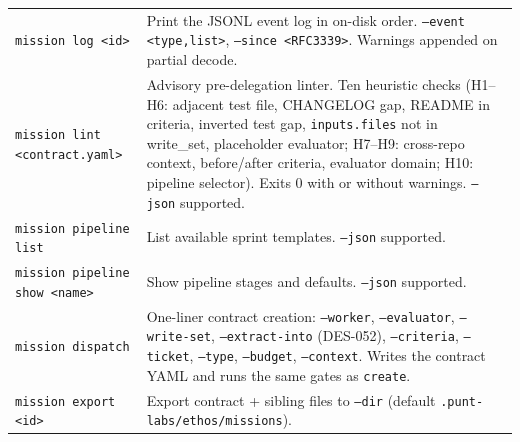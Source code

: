 \documentclass[a4paper,10pt]{article}
\newcommand{\field}[1]{\texttt{#1}}
\newcommand{\cmd}[1]{\texttt{#1}}
\newcommand{\fpath}[1]{\texttt{#1}}
\begin{document}
\begin{center}
\begin{tabular}{@{}lp{6.5cm}@{}}
\cmd{mission log <id>}              & Print the JSONL event log
                                       in on-disk order.
                                       \cmd{--event <type,list>},
                                       \cmd{--since <RFC3339>}.
                                       Warnings appended on
                                       partial decode. \\
\cmd{mission lint <contract.yaml>}  & Advisory pre-delegation
                                       linter.  Ten heuristic
                                       checks (H1--H6: adjacent test
                                       file, CHANGELOG gap, README in
                                       criteria, inverted test gap,
                                       \field{inputs.files} not in
                                       write\_set, placeholder
                                       evaluator; H7--H9: cross-repo
                                       context, before/after criteria,
                                       evaluator domain; H10: pipeline
                                       selector).  Exits 0 with
                                       or without warnings.
                                       \cmd{--json} supported. \\
\cmd{mission pipeline list}        & List available sprint templates.
                                       \cmd{--json} supported. \\
\cmd{mission pipeline show <name>} & Show pipeline stages and
                                       defaults.  \cmd{--json}
                                       supported. \\
\cmd{mission dispatch}             & One-liner contract creation:
                                       \cmd{--worker}, \cmd{--evaluator},
                                       \cmd{--write-set},
                                       \cmd{--extract-into} (DES-052),
                                       \cmd{--criteria},
                                       \cmd{--ticket}, \cmd{--type},
                                       \cmd{--budget},
                                       \cmd{--context}.  Writes the
                                       contract YAML and runs the
                                       same gates as \cmd{create}. \\
\cmd{mission export <id>}          & Export contract + sibling files
                                       to \cmd{--dir} (default
                                       \fpath{.punt-labs/ethos/missions}). \\

\end{tabular}
\end{center}
\end{document}
